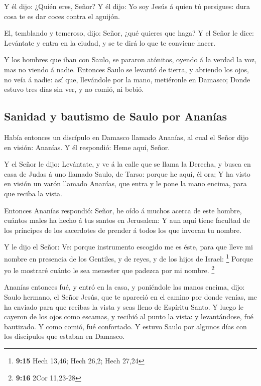  Y él dijo: ¿Quién eres, Señor? Y él dijo: Yo soy Jesús á
quien tú persigues: dura cosa te es dar coces contra el aguijón.

 El, temblando y temeroso, dijo: Señor, ¿qué quieres que
haga? Y el Señor le dice: Levántate y entra en la ciudad, y se te dirá
lo que te conviene hacer.

 Y los hombres que iban con Saulo, se pararon atónitos,
oyendo á la verdad la voz, mas no viendo á nadie. 
Entonces Saulo se levantó de tierra, y abriendo los ojos, no veía á
nadie: así que, llevándole por la mano, metiéronle en Damasco;
 Donde estuvo tres días sin ver, y no comió, ni bebió.

\hypertarget{sanidad-y-bautismo-de-saulo-por-ananuxedas}{%
\subsection{Sanidad y bautismo de Saulo por
Ananías}\label{sanidad-y-bautismo-de-saulo-por-ananuxedas}}

 Había entonces un discípulo en Damasco llamado Ananías,
al cual el Señor dijo en visión: Ananías. Y él respondió: Heme aquí,
Señor.

 Y el Señor le dijo: Levántate, y ve á la calle que se
llama la Derecha, y busca en casa de Judas á uno llamado Saulo, de
Tarso: porque he aquí, él ora;  Y ha visto en visión un
varón llamado Ananías, que entra y le pone la mano encima, para que
reciba la vista.

 Entonces Ananías respondió: Señor, he oído á muchos
acerca de este hombre, cuántos males ha hecho á tus santos en Jerusalem:
 Y aun aquí tiene facultad de los príncipes de los
sacerdotes de prender á todos los que invocan tu nombre.

 Y le dijo el Señor: Ve: porque instrumento escogido me
es éste, para que lleve mi nombre en presencia de los Gentiles, y de
reyes, y de los hijos de Israel: \footnote{\textbf{9:15} Hech 13,46;
  Hech 26,2; Hech 27,24}  Porque yo le mostraré cuánto le
sea menester que padezca por mi nombre. \footnote{\textbf{9:16} 2Cor
  11,23-28}

 Ananías entonces fué, y entró en la casa, y poniéndole
las manos encima, dijo: Saulo hermano, el Señor Jesús, que te apareció
en el camino por donde venías, me ha enviado para que recibas la vista y
seas lleno de Espíritu Santo.  Y luego le cayeron de los
ojos como escamas, y recibió al punto la vista: y levantándose, fué
bautizado.  Y como comió, fué confortado. Y estuvo Saulo
por algunos días con los discípulos que estaban en Damasco.

